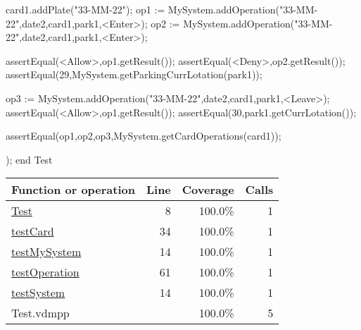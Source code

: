 \begin{vdmpp}[breaklines=true]
  card1.addPlate("33-MM-22");
  op1 := MySystem.addOperation("33-MM-22",date2,card1,park1,<Enter>);
  op2 := MySystem.addOperation("33-MM-22",date2,card1,park1,<Enter>);
  
  assertEqual(<Allow>,op1.getResult());
  assertEqual(<Deny>,op2.getResult());
  assertEqual(29,MySystem.getParkingCurrLotation(park1));
  
  op3 := MySystem.addOperation("33-MM-22",date2,card1,park1,<Leave>);
  assertEqual(<Allow>,op1.getResult());
  assertEqual(30,park1.getCurrLotation());
  
  assertEqual({op1,op2,op3},MySystem.getCardOperations(card1));
  
 );
end Test
\end{vdmpp}
\bigskip
\begin{longtable}{|l|r|r|r|}
\hline
Function or operation & Line & Coverage & Calls \\
\hline
\hline
\hyperref[Test:8]{Test} & 8&100.0\% & 1 \\
\hline
\hyperref[testCard:34]{testCard} & 34&100.0\% & 1 \\
\hline
\hyperref[testMySystem:14]{testMySystem} & 14&100.0\% & 1 \\
\hline
\hyperref[testOperation:61]{testOperation} & 61&100.0\% & 1 \\
\hline
\hyperref[testSystem:14]{testSystem} & 14&100.0\% & 1 \\
\hline
\hline
Test.vdmpp & & 100.0\% & 5 \\
\hline
\end{longtable}

